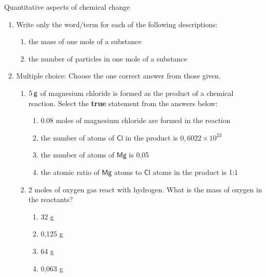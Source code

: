             \begin{eocexercises}{Quantitative aspects of chemical change}
            \nopagebreak
      \label{m38712*id286171}\begin{enumerate}[noitemsep, label=\textbf{\arabic*}. ] 
            \label{m38712*uid123}\item Write only the word/term for each of the following descriptions:
\label{m38712*id286187}\begin{enumerate}[noitemsep, label=\textbf{\alph*}. ] 
            \label{m38712*uid124}\item the mass of one mole of a substance
\label{m38712*uid125}\item the number of particles in one mole of a substance
\end{enumerate}
                \label{m38712*uid126}\item Multiple choice: Choose the one correct answer from those given.
\label{m38712*id286228}\begin{enumerate}[noitemsep, label=\textbf{\alph*}. ] 
            \label{m38712*uid127}\item $5\phantom{\rule{2pt}{0ex}}\mathsf{g}$ of magnesium chloride is formed as the product of a chemical reaction. Select the \textbf{true} statement from the answers below:
\label{m38712*id286251}\begin{enumerate}[noitemsep, label=\textbf{\alph*}. ] 
            \label{m38712*uid128}\item 0.08 moles of magnesium chloride are formed in the reaction
\label{m38712*uid129}\item the number of atoms of $\mathsf{Cl}$ in the product is $0,6022\ensuremath{\times}{10}^{23}$\label{m38712*uid130}\item the number of atoms of $\mathsf{Mg}$ is 0,05
\label{m38712*uid131}\item the atomic ratio of $\mathsf{Mg}$ atoms to $\mathsf{Cl}$ atoms in the product is 1:1
\end{enumerate}
                \label{m38712*uid132}\item 2 moles of oxygen gas react with hydrogen. What is the mass of oxygen in the reactants?
\label{m38712*id286339}\begin{enumerate}[noitemsep, label=\textbf{\alph*}. ] 
            \label{m38712*uid133}\item 32 g
\label{m38712*uid134}\item 0,125 g
\label{m38712*uid135}\item 64 g
\label{m38712*uid136}\item 0,063 g

\end{enumerate}
\end{enumerate}
\end{enumerate}
\end{eocexercises}
